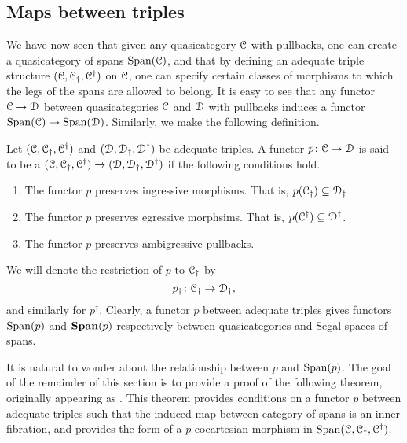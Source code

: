 \documentclass[main.tex]{subfiles}
\begin{document}
\subsection{Maps between triples}
\label{ssc:maps_between_triples}

We have now seen that given any quasicategory $\mathcal{C}$ with pullbacks, one can create a quasicategory of spans $\mathrm{Span}(\mathcal{C})$, and that by defining an adequate triple structure $(\mathcal{C}, \mathcal{C}_{\dagger}, \mathcal{C}^{\dagger})$ on $\mathcal{C}$, one can specify certain classes of morphisms to which the legs of the spans are allowed to belong. It is easy to see that any functor $\mathcal{C} \to \mathcal{D}$ between quasicategories $\mathcal{C}$ and $\mathcal{D}$ with pullbacks induces a functor $\mathrm{Span}(\mathcal{C}) \to \mathrm{Span}(\mathcal{D})$. Similarly, we make the following definition.

\begin{definition}
  Let $(\mathcal{C}, \mathcal{C}_{\dagger}, \mathcal{C}^{\dagger})$ and $(\mathcal{D}, \mathcal{D}_{\dagger}, \mathcal{D}^{\dagger})$ be adequate triples. A functor $p\colon \mathcal{C} \to \mathcal{D}$ is said to be a  $(\mathcal{C}, \mathcal{C}_{\dagger}, \mathcal{C}^{\dagger}) \to (\mathcal{D}, \mathcal{D}_{\dagger}, \mathcal{D}^{\dagger})$ 
  if the following conditions hold. 
  \begin{enumerate}
    \item The functor $p$ preserves ingressive morphisms. That is, $p(\mathcal{C}_{\dagger}) \subseteq \mathcal{D}_{\dagger}$

    \item The functor $p$ preserves egressive morphsims. That is, $p(\mathcal{C}^{\dagger}) \subseteq \mathcal{D}^{\dagger}$. 

    \item The functor $p$ preserves ambigressive pullbacks.
  \end{enumerate}
\end{definition}

We will denote the restriction of $p$ to $\mathcal{C}_{\dagger}$ by
\begin{equation*}
  p_{\dagger}\colon\mathcal{C}_{\dagger} \to \mathcal{D}_{\dagger},
\end{equation*}
and similarly for $p^{\dagger}$. Clearly, a functor $p$ between adequate triples gives functors $\mathrm{Span}(p)$ and $\mathbf{Span}(p)$ respectively between quasicategories and Segal spaces of spans.

It is natural to wonder about the relationship between $p$ and $\mathrm{Span}(p)$. The goal of the remainder of this section is to provide a proof of the following theorem, originally appearing as \cite[Thm.\ 12.2]{spectralmackeyfunctors1}. This theorem provides conditions on a functor $p$ between adequate triples such that the induced map between category of spans is an inner fibration, and provides the form of a $p$-cocartesian morphism in $\mathrm{Span}(\mathcal{C}, \mathcal{C}_{\dagger}, \mathcal{C}^{\dagger})$.
\end{document}
